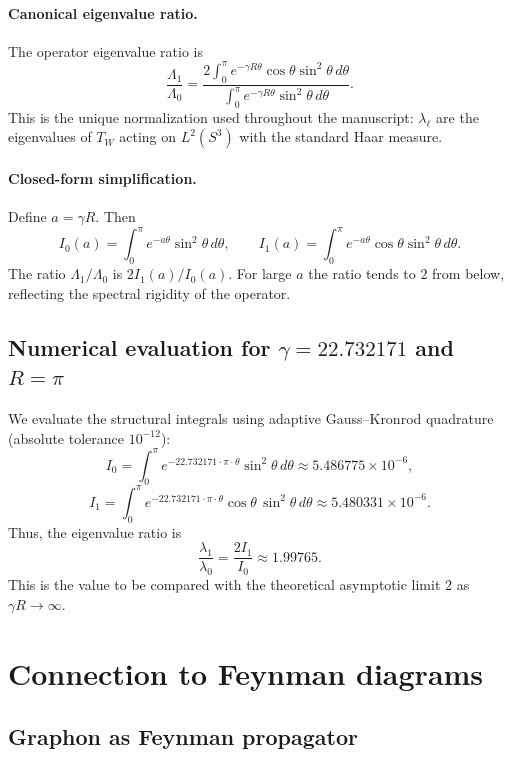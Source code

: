 \documentclass[12pt]{article}
\numberwithin{equation}{section}
\newcommand{\SphereR}{R}
\begin{document}
\paragraph{Canonical eigenvalue ratio.} The operator eigenvalue ratio is
\begin{equation}\label{eq:ratio_canonical}
\frac{\Lambda_1}{\Lambda_0}
= \frac{2\displaystyle\int_0^\pi e^{-\gamma\SphereR\theta} \cos\theta \sin^2\theta\,d\theta}
{\displaystyle\int_0^\pi e^{-\gamma\SphereR\theta} \sin^2\theta\,d\theta}.
\end{equation}
This is the unique normalization used throughout the manuscript: \(\lambda_\ell\) are the eigenvalues of \(T_W\) acting on \(L^2(S^3)\) with the standard Haar measure.

\paragraph{Closed-form simplification.} Define \(a = \gamma\SphereR\). Then
\[
I_0(a) = \int_0^\pi e^{-a\theta}\sin^2\theta\,d\theta,\qquad
I_1(a) = \int_0^\pi e^{-a\theta}\cos\theta\sin^2\theta\,d\theta.
\]
The ratio \(\Lambda_1/\Lambda_0\) is \(2I_1(a)/I_0(a)\). For large \(a\) the ratio tends to \(2\) from below, reflecting the spectral rigidity of the operator.

\subsection{Numerical evaluation for \(\gamma = 22.732171\) and \(\SphereR = \pi\)}

We evaluate the structural integrals using adaptive Gauss--Kronrod quadrature (absolute tolerance \(10^{-12}\)):
\[
I_0 = \int_0^\pi e^{-22.732171 \cdot \pi \cdot \theta} \sin^2\theta \, d\theta \approx 5.486775 \times 10^{-6},
\]
\[
I_1 = \int_0^\pi e^{-22.732171 \cdot \pi \cdot \theta} \cos\theta \, \sin^2\theta \, d\theta \approx 5.480331 \times 10^{-6}.
\]
Thus, the eigenvalue ratio is
\[
\frac{\lambda_1}{\lambda_0} = \frac{2I_1}{I_0} \approx 1.99765.
\]
This is the value to be compared with the theoretical asymptotic limit \(2\) as \(\gamma\SphereR \to \infty\).

\section{Connection to Feynman diagrams}
\subsection{Graphon as Feynman propagator}
\end{document}
